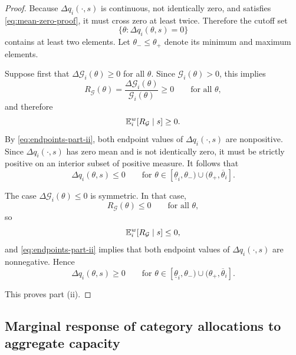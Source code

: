 \documentclass[master.tex]{subfiles}
\begin{document}
\begin{proof}
Because $\Delta q_i(\cdot,s)$ is continuous, not identically zero, and satisfies \eqref{eq:mean-zero-proof}, it must cross zero at least twice. Therefore the cutoff set
\[
\{\theta:\Delta q_i(\theta,s)=0\}
\]
contains at least two elements. Let $\theta_-\le \theta_+$ denote its minimum and maximum elements.

Suppose first that $\Delta\mathcal G_i(\theta)\ge 0$ for all $\theta$. Since $\mathcal G_i(\theta)>0$, this implies
\[
R_{\mathcal G}(\theta)=\frac{\Delta\mathcal G_i(\theta)}{\mathcal G_i(\theta)}\ge 0
\qquad
\text{for all }\theta,
\]
and therefore
\[
\mathbb{E}_i^w[R_{\mathcal G}\mid s]\ge 0.
\]
By \eqref{eq:endpoints-part-ii}, both endpoint values of $\Delta q_i(\cdot,s)$ are nonpositive. Since $\Delta q_i(\cdot,s)$ has zero mean and is not identically zero, it must be strictly positive on an interior subset of positive measure. It follows that
\[
\Delta q_i(\theta,s)\le 0
\qquad
\text{for }\theta\in[\underline\theta_i,\theta_-)\cup(\theta_+,\overline\theta_i].
\]

The case $\Delta\mathcal G_i(\theta)\le 0$ is symmetric. In that case,
\[
R_{\mathcal G}(\theta)\le 0
\qquad\text{for all }\theta,
\]
so
\[
\mathbb{E}_i^w[R_{\mathcal G}\mid s]\le 0,
\]
and \eqref{eq:endpoints-part-ii} implies that both endpoint values of $\Delta q_i(\cdot,s)$ are nonnegative. Hence
\[
\Delta q_i(\theta,s)\ge 0
\qquad
\text{for }\theta\in[\underline\theta_i,\theta_-)\cup(\theta_+,\overline\theta_i].
\]

This proves part (ii).
\end{proof}


\subsection{Marginal response of category allocations to aggregate capacity}
\end{document}

